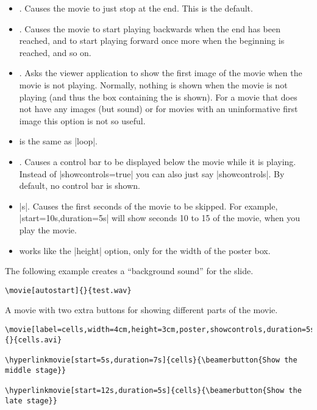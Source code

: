 \begin{command}{\movie{}}
\begin{itemize}
    . Causes the movie to start again when the end has
    been reached. Normally, the movie just stops at the end.
  \item
    . Causes the movie to just stop at the end. This is
    the default.
  \item
    . Causes the movie to start playing backwards
    when the end has been reached, and to start playing forward once
    more when the beginning is reached, and so on.
  \item
    . Asks the viewer application to show the first
    image of the movie when the movie is not playing. Normally,
    nothing is shown when the movie is not playing (and thus the box
    containing the  is shown). For a movie that does
    not have any images (but sound) or for movies with an
    uninformative first image this option is not so useful.
  \item
     is the same as |loop|.
  \item
    . Causes a control bar
    to be displayed below the movie while it is playing. Instead of
    |showcontrols=true| you can also just say |showcontrols|. By
    default, no control bar is shown.
  \item
    |s|. Causes the first
     seconds of the movie to be skipped. For example,
    |start=10s,duration=5s| will show seconds 10 to 15 of the movie,
    when you play the movie.
  \item
     works like the |height|
    option, only for the width of the poster box.
  \end{itemize}

  \example The following example creates a ``background sound'' for
  the slide.
\begin{verbatim}
\movie[autostart]{}{test.wav}
\end{verbatim}

  \example A movie with two extra buttons for showing different parts
  of the movie.
\begin{verbatim}
\movie[label=cells,width=4cm,height=3cm,poster,showcontrols,duration=5s]{}{cells.avi}

\hyperlinkmovie[start=5s,duration=7s]{cells}{\beamerbutton{Show the middle stage}}

\hyperlinkmovie[start=12s,duration=5s]{cells}{\beamerbutton{Show the late stage}}
\end{verbatim}
\end{command}

